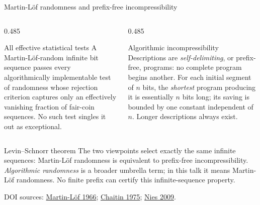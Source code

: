 \documentclass{beamer}
\newcommand{\doiref}[2]{%
  \href{https://doi.org/#1}{\textcolor{blue!65!black}{#2}}}
\newcommand{\sourcefoot}[1]{%
  \par\vfill{\tiny\color{black!60}DOI sources: #1\par}}
\begin{document}
\begin{frame}{Martin-L\"of randomness and prefix-free incompressibility}
\footnotesize
\begin{columns}[T,onlytextwidth]
\begin{column}{0.485\textwidth}
\begin{block}{All effective statistical tests}
A Martin-L\"of-random infinite bit sequence passes every algorithmically
implementable test of randomness whose rejection criterion captures only an
effectively vanishing fraction of fair-coin sequences.  No such test singles
it out as exceptional.
\end{block}
\end{column}

\begin{column}{0.485\textwidth}
\begin{exampleblock}{Algorithmic incompressibility}
Descriptions are \emph{self-delimiting}, or prefix-free, programs: no complete
program begins another.  For each initial segment of $n$ bits, the
\emph{shortest} program producing it is essentially $n$ bits long; its saving
is bounded by one constant independent of $n$.  Longer descriptions always
exist.
\end{exampleblock}
\end{column}
\end{columns}

\begin{alertblock}{Levin--Schnorr theorem}
The two viewpoints select exactly the same infinite sequences: Martin-L\"of
randomness is equivalent to prefix-free incompressibility.  \emph{Algorithmic
randomness} is a broader umbrella term; in this talk it means Martin-L\"of
randomness.  No finite prefix can certify this infinite-sequence property.
\end{alertblock}

\sourcefoot{\doiref{10.1016/S0019-9958(66)80018-9}{Martin-L\"of 1966};
\doiref{10.1145/321892.321894}{Chaitin 1975};
\doiref{10.1093/acprof:oso/9780199230761.001.0001}{Nies 2009}.}
\end{frame}
\end{document}
